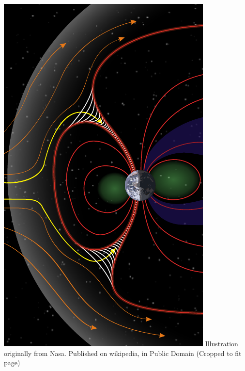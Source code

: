 \documentclass{beamer}
\begin{document}
\begin{frame}
\begin{columns}
\begin{column}{0.5\linewidth}
{%
\includegraphics[width=0.8\linewidth]{Structure_of_the_magnetosphere_Nasa.pdf}%
{\color{gray} Illustration originally from Nasa. Published on wikipedia, in Public Domain (Cropped to fit page) }
}%
\end{column}
\end{columns}
\end{frame}
\end{document}
